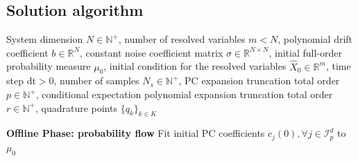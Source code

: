 \documentclass[11pt, a4paper, oneside, reqno]{amsart}
\begin{document}
\subsection{Solution algorithm}
\begin{algorithm}[H]
\caption{Surrogate trajectories along probability flows}
\label{alg:solution algo}
\begin{algorithmic}[1]
\Require System dimension $N\in\mathbb{N}^+$, number of resolved variables $m<N$, polynomial drift coefficient $b\in\mathbb{R}^N$, constant noise coefficient matrix $\sigma\in\mathbb{R}^{N\times N}$, initial full-order probability measure $\mu_0$, initial condition for the resolved variables $\hat{X}_0\in \mathbb{R}^m$, time step $\mathrm{dt}>0$, number of samples $N_s\in\mathbb{N}^+$, PC expansion truncation total order $p\in\mathbb{N}^+$, conditional expectation polynomial expansion truncation total order $r\in\mathbb{N}^+$, quadrature points $\{q_k\}_{k\in K}$

\Statex %

\Statex \textbf{Offline Phase: probability flow}
\State Fit initial PC coefficients $c_j(0), \forall j\in \mathcal{I}_p^d$ to $\mu_0$


\end{algorithmic}
\end{algorithm}
\end{document}
